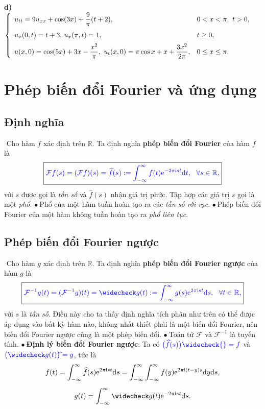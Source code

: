\documentclass[10pt, a4paper]{article}
\begin{document}
	\textbf{d) }$\begin{cases}
		\begin{array}{ll}
			u_{tt}=9u_{xx}+\cos(3x)+\dfrac9\pi(t+2), & 0<x<\pi,~t>0, \\
			\noalign{\vskip6pt}
			u_x(0,t)=t+3,\,u_x(\pi,t)=1, & t\ge0, \\
			\noalign{\vskip5pt}
			u(x,0)=\cos(5x)+3x-\dfrac{x^2}{\pi},~u_t(x,0)=\pi\cos x+x+\dfrac{3x^2}{2\pi}, & 0\le x\le\pi.
		\end{array}
	\end{cases}$
	\newpage
	\section{Phép biến đổi Fourier và ứng dụng}
	\subsection{Định nghĩa}
	\vspace{2mm}
	\quad\,\,Cho hàm $f$ xác định trên $\mathbb R$. Ta định nghĩa \textbf{\color{red}phép biến đổi Fourier} của hàm $f$ là $$\boxed{\color{blue}\mathcal Ff(s)=(\mathcal Ff)(s)=\widehat f(s):=\displaystyle\int_{-\infty}^\infty f(t)\mathrm e^{-2\pi\text{i}st}\text{d}t,~~\forall s\in\mathbb R,}$$
	với $s$ được gọi là \textit{tần số} và $\widehat f(s)$ nhận giá trị phức. Tập hợp các giá trị $s$ gọi là một \textit{phổ.}\vskip7pt
	$\bullet~$Phổ của một hàm tuần hoàn tạo ra các \textit{tần số rời rạc}.\vskip7pt
	$\bullet~$Phép biến đổi Fourier của một hàm không tuần hoàn tạo ra \textit{phổ liên tục}.
	\subsection{Phép biến đổi Fourier ngược}
	\vspace{2mm}
	\quad\,\,Cho hàm $g$ xác định trên $\mathbb R$. Ta định nghĩa \textbf{\color{red}phép biến đổi Fourier ngược} của hàm $g$ là $$\boxed{\color{blue}\mathcal F^{-1}g(t)=(\mathcal F^{-1}g)(t)=\widecheck g(t):=\displaystyle\int_{-\infty}^\infty g(s)\mathrm e^{2\pi\text{i}st}\text{d}s,~~\forall t\in\mathbb R,}$$
	với $s$ là \textit{tần số}.\vskip7pt
	Điều này cho ta thấy định nghĩa tích phân như trên có thể được áp dụng vào bất kỳ hàm nào, không nhất thiết phải là một biến đổi Fourier, nên biến đổi Fourier ngược cũng là một phép biến đổi.\vskip7pt
	$\bullet~$Toán tử $\mathcal F$ và $\mathcal F^{-1}$ là tuyến tính.\vskip7pt
	$\bullet~$\textbf{Định lý biến đổi Fourier ngược}: Ta có $\color{blue}\big(\widehat f(s)\big)\widecheck{}=f$ và $\color{blue}\big(\widecheck g(t)\big)\widehat{}=g$, tức là \begin{gather*}
		f(t)=\int_{-\infty}^\infty\widehat f(s)\mathrm e^{2\pi\mathrm ist}\mathrm ds=\int_{-\infty}^\infty\int_{-\infty}^\infty f(y)\mathrm e^{2\pi\mathrm i(t-y)s}\mathrm dy\mathrm ds,\\
		\noalign{\vskip5pt}
		g(t)=\int_{-\infty}^\infty\widecheck g(t)\mathrm e^{-2\pi\mathrm ist}\mathrm ds.
	\end{gather*}
	
\end{document}
